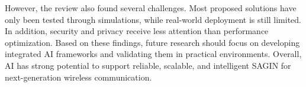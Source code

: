 \documentclass[letterpaper]{article} %
\begin{document}
However, the review also found several challenges. Most proposed solutions have only been tested through simulations, while real-world deployment is still limited. In addition, security and privacy receive less attention than performance optimization. Based on these findings, future research should focus on developing integrated AI frameworks and validating them in practical environments. Overall, AI has strong potential to support reliable, scalable, and intelligent SAGIN for next-generation wireless communication.





\end{document}
